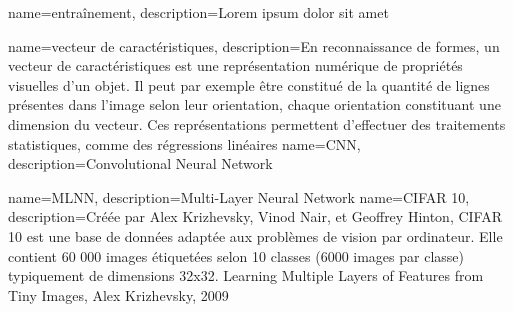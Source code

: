 \makeglossaries

{
  name={entraînement},
	description={Lorem ipsum dolor sit amet}
}

{
  name={vecteur de caractéristiques},
	description={En reconnaissance de formes, un vecteur de caractéristiques est une représentation numérique de
	propriétés visuelles d'un objet. Il peut par exemple être constitué de la quantité de lignes présentes dans
	l'image selon leur orientation, chaque orientation constituant une dimension du vecteur. Ces représentations
	permettent d'effectuer des traitements statistiques, comme des régressions linéaires}
}
{
  name={CNN},
	description={Convolutional Neural Network}
}

{
  name={MLNN},
	description={Multi-Layer Neural Network}
}
{
  name={CIFAR 10},
	description={Créée par Alex Krizhevsky, Vinod Nair, et Geoffrey Hinton, CIFAR 10 est une base de données adaptée aux problèmes de vision par ordinateur. Elle contient 60 000 images étiquetées selon 10 classes (6000 images par classe) typiquement de dimensions 32x32. Learning Multiple Layers of Features from Tiny Images, Alex Krizhevsky, 2009}
}
